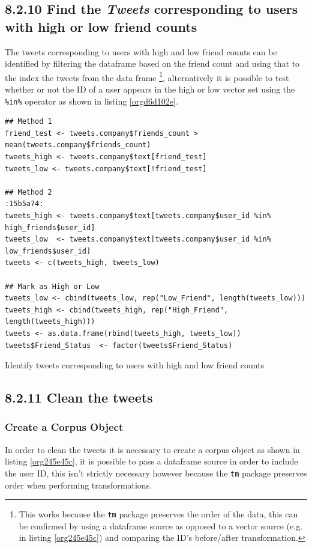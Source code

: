 \documentclass[11pt]{article}
\begin{document}
\subsection{8.2.10 Find the \emph{Tweets} corresponding to users with high or low friend counts}
\label{sec:orge33ece9}
The tweets corresponding to users with high and low friend counts can be
identified by filtering the dataframe based on the friend count and using that
to the index the tweets from the data frame \footnote{This works because the \texttt{tm} package preserves the order of the data, this can be confirmed by using a dataframe source as opposed to a vector source (e.g. in listing \ref{org245e45c}) and comparing the ID's before/after transformation.}, alternatively it is possible
to test whether or not the ID of a user appears in the high or low vector
set using the \texttt{\%in\%} operator as shown in listing \ref{orgd6d102e}.

\begin{listing}[htbp]
\begin{verbatim}
## Method 1
friend_test <- tweets.company$friends_count > mean(tweets.company$friends_count)
tweets_high <- tweets.company$text[friend_test]
tweets_low <- tweets.company$text[!friend_test]

## Method 2                                                                 :15b5a74:
tweets_high <- tweets.company$text[tweets.company$user_id %in%  high_friends$user_id]
tweets_low  <- tweets.company$text[tweets.company$user_id %in%  low_friends$user_id]
tweets <- c(tweets_high, tweets_low)

## Mark as High or Low
tweets_low <- cbind(tweets_low, rep("Low_Friend", length(tweets_low)))
tweets_high <- cbind(tweets_high, rep("High_Friend", length(tweets_high)))
tweets <- as.data.frame(rbind(tweets_high, tweets_low))
tweets$Friend_Status  <- factor(tweets$Friend_Status)
\end{verbatim}
\caption{\label{orgd6d102e}Identify tweets corresponding to users with high and low friend counts}
\end{listing}

\subsection{8.2.11 Clean the tweets}
\label{sec:org3329f46}
\subsubsection{Create a Corpus Object}
\label{sec:org9bb2d99}
In order to clean the tweets it is necessary to create a corpus object as shown in listing \ref{org245e45c}, it is possible to pass a dataframe source in order to include the user ID, this isn't strictly necessary however because the \texttt{tm} package preserves order when performing transformations.
\end{document}
